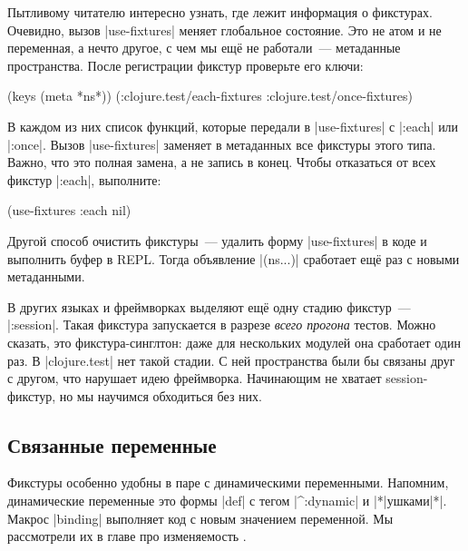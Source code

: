 Пытливому читателю интересно узнать, где лежит информация о фикстурах. Очевидно,
вызов \spverb|use-fixtures| меняет глобальное состояние. Это не атом и не
переменная, а нечто другое, с чем мы ещё не работали~--- метаданные
пространства. После регистрации фикстур проверьте его ключи:


\begin{english}
  \begin{clojure}
(keys (meta *ns*))
(:clojure.test/each-fixtures :clojure.test/once-fixtures)
  \end{clojure}
\end{english}

В каждом из них список функций, которые передали в \spverb|use-fixtures| с
\spverb|:each| или \spverb|:once|. Вызов \spverb|use-fixtures| заменяет в
метаданных все фикстуры этого типа. Важно, что это полная замена, а не запись в
конец. Чтобы отказаться от всех фикстур \spverb|:each|, выполните:

\begin{english}
  \begin{clojure}
(use-fixtures :each nil)
  \end{clojure}
\end{english}

Другой способ очистить фикстуры~--- удалить форму \spverb|use-fixtures| в коде и
выполнить буфер в REPL. Тогда объявление \spverb|(ns...)| сработает ещё раз с
новыми метаданными.

В других языках и фреймворках выделяют ещё одну стадию фикстур~---
\spverb|:session|. Такая фикстура запускается в разрезе \emph{всего прогона}
тестов. Можно сказать, это фикстура-синглтон: даже для нескольких модулей она
сработает один раз. В \spverb|clojure.test| нет такой стадии. С ней пространства
были бы связаны друг с другом, что нарушает идею фреймворка. Начинающим не
хватает session-фикстур, но мы научимся обходиться без них.

\subsection{Связанные переменные}


Фикстуры особенно удобны в паре с динамическими переменными. Напомним,
динамические переменные это формы \spverb|def| с тегом \spverb|^:dynamic| и
\spverb|*|ушками\spverb|*|. Макрос \spverb|binding| выполняет код с новым
значением переменной. Мы рассмотрели их в главе про
изменяемость .

